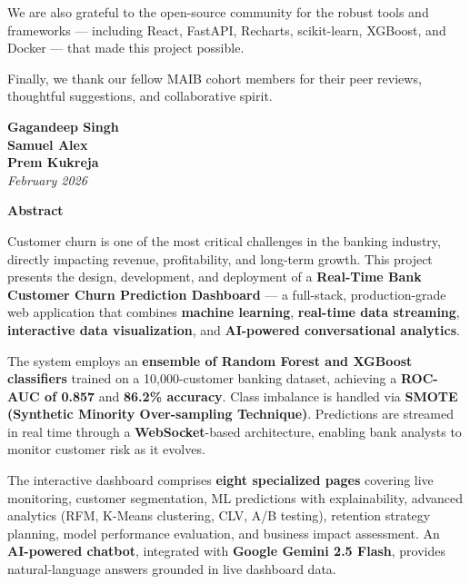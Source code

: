 \documentclass[12pt, a4paper]{report}
\begin{document}
We are also grateful to the open-source community for the robust tools and frameworks --- including React, FastAPI, Recharts, scikit-learn, XGBoost, and Docker --- that made this project possible.

Finally, we thank our fellow MAIB cohort members for their peer reviews, thoughtful suggestions, and collaborative spirit.

\vspace{1cm}
\begin{flushright}
\textbf{Gagandeep Singh}\\
\textbf{Samuel Alex}\\
\textbf{Prem Kukreja}\\[0.3cm]
\textit{February 2026}
\end{flushright}

\newpage
\thispagestyle{empty}
\begin{center}
    {\LARGE \textbf{\textcolor{spjblue}{Abstract}}}\\[1cm]
\end{center}

Customer churn is one of the most critical challenges in the banking industry, directly impacting revenue, profitability, and long-term growth. This project presents the design, development, and deployment of a \textbf{Real-Time Bank Customer Churn Prediction Dashboard} --- a full-stack, production-grade web application that combines \textbf{machine learning}, \textbf{real-time data streaming}, \textbf{interactive data visualization}, and \textbf{AI-powered conversational analytics}.

The system employs an \textbf{ensemble of Random Forest and XGBoost classifiers} trained on a 10,000-customer banking dataset, achieving a \textbf{ROC-AUC of 0.857} and \textbf{86.2\% accuracy}. Class imbalance is handled via \textbf{SMOTE (Synthetic Minority Over-sampling Technique)}. Predictions are streamed in real time through a \textbf{WebSocket}-based architecture, enabling bank analysts to monitor customer risk as it evolves.

The interactive dashboard comprises \textbf{eight specialized pages} covering live monitoring, customer segmentation, ML predictions with explainability, advanced analytics (RFM, K-Means clustering, CLV, A/B testing), retention strategy planning, model performance evaluation, and business impact assessment. An \textbf{AI-powered chatbot}, integrated with \textbf{Google Gemini 2.5 Flash}, provides natural-language answers grounded in live dashboard data.
\end{document}
